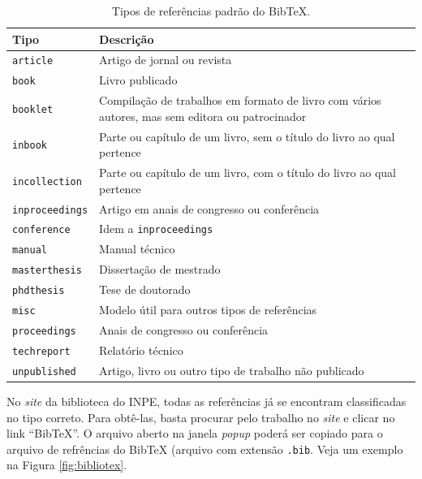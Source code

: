 \begin{table}[H]
\centering
\caption{Tipos de referências padrão do Bib\TeX{}.}
\label{tab:refs}
    \begin{tabular}{p{4cm}p{9cm}}
    \toprule
    \textbf{Tipo} & \textbf{Descrição} \\
    \midrule
    {\tt article}       & Artigo de jornal ou revista \\
    {\tt book}          & Livro publicado \\
    {\tt booklet}       & Compilação de trabalhos em formato de livro com vários autores, mas sem editora ou patrocinador \\
    {\tt inbook}        & Parte ou capítulo de um livro, sem o título do livro ao qual pertence \\
    {\tt incollection}  & Parte ou capítulo de um livro, com o título do livro ao qual pertence \\
    {\tt inproceedings} & Artigo em anais de congresso ou conferência \\
    {\tt conference}    & Idem a {\tt inproceedings} \\
    {\tt manual}        & Manual técnico \\
    {\tt masterthesis}  & Dissertação de mestrado \\
    {\tt phdthesis}     & Tese de doutorado \\
    {\tt misc}          & Modelo útil para outros tipos de referências \\
    {\tt proceedings}   & Anais de congresso ou conferência \\
    {\tt techreport}    & Relatório técnico \\
    {\tt unpublished}   & Artigo, livro ou outro tipo de trabalho não publicado \\
    \bottomrule
    \end{tabular}
\end{table}

No \textit{site} da biblioteca do INPE, todas as referências já se encontram classificadas no tipo correto. Para obtê-las, basta procurar pelo trabalho no \textit{site} e clicar no link ``Bib\TeX{}''. O arquivo aberto na janela \textit{popup} poderá ser copiado para o arquivo de refrências do Bib\TeX{} (arquivo com extensão {\tt .bib}. Veja um exemplo na Figura \ref{fig:bibliotex}.

